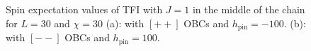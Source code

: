 	\begin{figure}[h!]
		\hspace{-0.4cm}
		\quad
		\caption{Spin expectation values of TFI with $J=1$ in the middle of the chain for $L=30$ and $\chi=30$ (a): with $[++]$ OBCs and $h_\text{pin}=-100$. (b): with $[--]$ OBCs and $h_\text{pin}=100$.}
		\label{fig:spinTFI}
	\end{figure}

